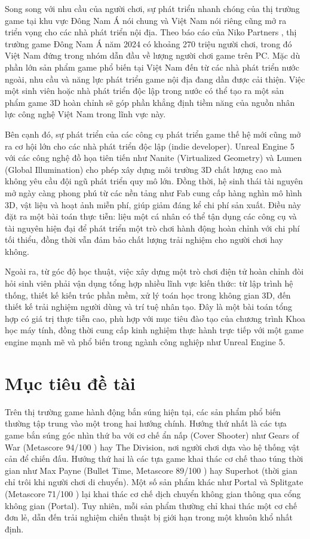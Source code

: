 \documentclass[../DoAn.tex]{subfiles}
\begin{document}
Song song với nhu cầu của người chơi, sự phát triển nhanh chóng của thị trường game tại khu vực Đông Nam Á nói chung và Việt Nam nói riêng cũng mở ra triển vọng cho các nhà phát triển nội địa. Theo báo cáo của Niko Partners \cite{NikoPartners2024}, thị trường game Đông Nam Á năm 2024 có khoảng 270 triệu người chơi, trong đó Việt Nam đứng trong nhóm dẫn đầu về lượng người chơi game trên PC. Mặc dù phần lớn sản phẩm game phổ biến tại Việt Nam đến từ các nhà phát triển nước ngoài, nhu cầu và năng lực phát triển game nội địa đang dần được cải thiện. Việc một sinh viên hoặc nhà phát triển độc lập trong nước có thể tạo ra một sản phẩm game 3D hoàn chỉnh sẽ góp phần khẳng định tiềm năng của nguồn nhân lực công nghệ Việt Nam trong lĩnh vực này.

Bên cạnh đó, sự phát triển của các công cụ phát triển game thế hệ mới cũng mở ra cơ hội lớn cho các nhà phát triển độc lập (indie developer). Unreal Engine 5 với các công nghệ đồ họa tiên tiến như Nanite (Virtualized Geometry) và Lumen (Global Illumination) cho phép xây dựng môi trường 3D chất lượng cao mà không yêu cầu đội ngũ phát triển quy mô lớn. Đồng thời, hệ sinh thái tài nguyên mở ngày càng phong phú từ các nền tảng như Fab cung cấp hàng nghìn mô hình 3D, vật liệu và hoạt ảnh miễn phí, giúp giảm đáng kể chi phí sản xuất. Điều này đặt ra một bài toán thực tiễn: liệu một cá nhân có thể tận dụng các công cụ và tài nguyên hiện đại để phát triển một trò chơi hành động hoàn chỉnh với chi phí tối thiểu, đồng thời vẫn đảm bảo chất lượng trải nghiệm cho người chơi hay không.

Ngoài ra, từ góc độ học thuật, việc xây dựng một trò chơi điện tử hoàn chỉnh đòi hỏi sinh viên phải vận dụng tổng hợp nhiều lĩnh vực kiến thức: từ lập trình hệ thống, thiết kế kiến trúc phần mềm, xử lý toán học trong không gian 3D, đến thiết kế trải nghiệm người dùng và trí tuệ nhân tạo. Đây là một bài toán tổng hợp có giá trị thực tiễn cao, phù hợp với mục tiêu đào tạo của chương trình Khoa học máy tính, đồng thời cung cấp kinh nghiệm thực hành trực tiếp với một game engine mạnh mẽ và phổ biến trong ngành công nghiệp như Unreal Engine 5.

\section{Mục tiêu đề tài}
\label{section:1.2}

Trên thị trường game hành động bắn súng hiện tại, các sản phẩm phổ biến thường tập trung vào một trong hai hướng chính. Hướng thứ nhất là các tựa game bắn súng góc nhìn thứ ba với cơ chế ẩn nấp (Cover Shooter) như Gears of War (Metascore 94/100 \cite{MetacriticGearsOfWar}) hay The Division, nơi người chơi dựa vào hệ thống vật cản để chiến đấu. Hướng thứ hai là các tựa game khai thác cơ chế thao túng thời gian như Max Payne (Bullet Time, Metascore 89/100 \cite{MetacriticMaxPayne}) hay Superhot (thời gian chỉ trôi khi người chơi di chuyển). Một số sản phẩm khác như Portal và Splitgate (Metascore 71/100 \cite{MetacriticSplitgate}) lại khai thác cơ chế dịch chuyển không gian thông qua cổng không gian (Portal). Tuy nhiên, mỗi sản phẩm thường chỉ khai thác một cơ chế đơn lẻ, dẫn đến trải nghiệm chiến thuật bị giới hạn trong một khuôn khổ nhất định.
\end{document}
